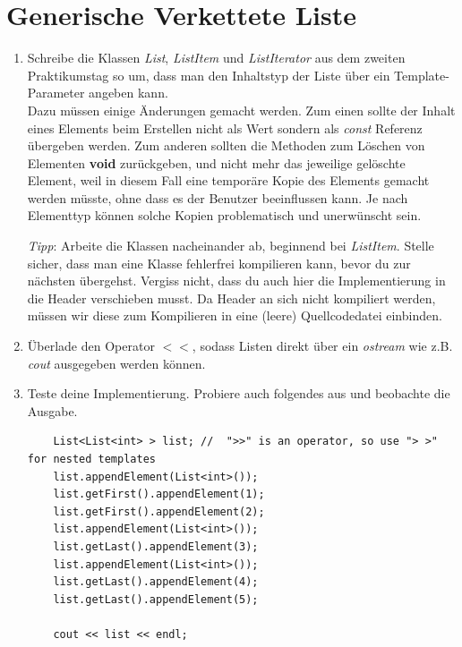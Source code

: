 \section{Generische Verkettete Liste}
\label{sec:list}
\begin{enumerate}
\item 
Schreibe die Klassen \emph{List}, \emph{ListItem} und \emph{ListIterator} aus dem zweiten Praktikumstag so um, dass man den Inhaltstyp der Liste über ein Template-Parameter angeben kann.\\

Dazu müssen einige Änderungen gemacht werden.
Zum einen sollte der Inhalt eines Elements beim Erstellen nicht als Wert sondern als \emph{const} Referenz übergeben werden.
Zum anderen sollten die Methoden zum Löschen von Elementen \textbf{void} zurückgeben, und nicht mehr das jeweilige gelöschte Element, weil in diesem Fall eine temporäre Kopie des Elements gemacht werden müsste, ohne dass es der Benutzer beeinflussen kann.
Je nach Elementtyp können solche Kopien problematisch und unerwünscht sein.

\emph{Tipp}: Arbeite die Klassen nacheinander ab, beginnend bei \emph{ListItem}.
Stelle sicher, dass man eine Klasse fehlerfrei kompilieren kann, bevor du zur nächsten übergehst.
Vergiss nicht, dass du auch hier die Implementierung in die Header verschieben musst.
Da Header an sich nicht kompiliert werden, müssen wir diese zum Kompilieren in eine (leere) Quellcodedatei einbinden.\\

\item
Überlade den Operator $<<$, sodass Listen direkt über ein \emph{ostream} wie z.B. \emph{cout} ausgegeben werden können. 

\item Teste deine Implementierung. Probiere auch folgendes aus und beobachte die Ausgabe.

\begin{lstlisting}
	List<List<int> > list; //  ">>" is an operator, so use "> >" for nested templates
	list.appendElement(List<int>());
	list.getFirst().appendElement(1);
	list.getFirst().appendElement(2);
	list.appendElement(List<int>());
	list.getLast().appendElement(3);
	list.appendElement(List<int>());
	list.getLast().appendElement(4);
	list.getLast().appendElement(5);
	
	cout << list << endl;
\end{lstlisting}
\end{enumerate}

